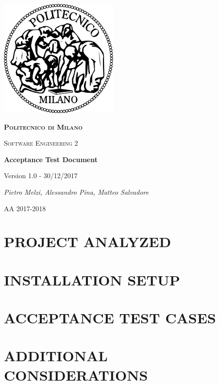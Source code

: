 \documentclass[11pt]{report}
\begin{document}
	\begin{titlepage}
		\centering
		\includegraphics{logo.png}\par\vspace{1cm}
		{\scshape\LARGE\bfseries Politecnico di Milano \par}
		\vspace{1cm}
		{\scshape\Large Software Engineering 2\par}
		\vspace{1.5cm}
		{\Huge\bfseries Acceptance Test Document\par}
		\vspace{1cm}
		{\small Version 1.0 - 30/12/2017\par} 
		\vspace{1cm}
		{\Large\itshape Pietro Melzi, Alessandro Pina, Matteo Salvadore\par}

		\vfill

		{\large AA 2017-2018\par}
	\end{titlepage}

	\tableofcontents{}

	\chapter{PROJECT ANALYZED}
	\label{ch:PROJECT ANALYZED}
		
			
	\chapter{INSTALLATION SETUP}
	\label{ch:INSTALLATION SETUP}
		
			
	\chapter{ACCEPTANCE TEST CASES}
	\label{ch:ACCEPTANCE TEST CASES}
		
	
	\chapter{ADDITIONAL CONSIDERATIONS}
	\label{ch:ADDITIONAL CONSIDERATIONS}	
		
\end{document}
